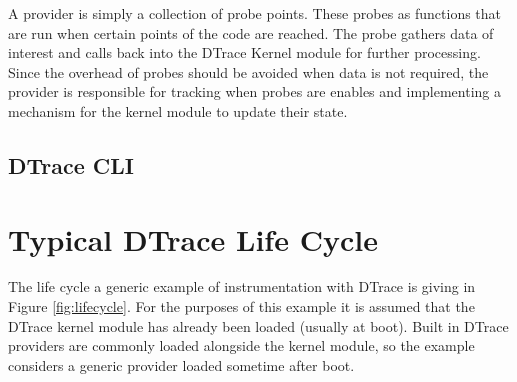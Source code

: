 A provider is simply a collection of probe points. These probes as functions that are run when certain points of the code are reached. The probe gathers data of interest and calls back into the DTrace Kernel module for further processing. Since the overhead of probes should be avoided when data is not required, the provider is responsible for tracking when probes are enables and implementing a mechanism for the kernel module to update their state.





\subsection{DTrace CLI}


\section{Typical DTrace Life Cycle}


The life cycle a generic example of instrumentation with DTrace is giving in Figure \ref{fig:lifecycle}. For the purposes of this example it is assumed that the DTrace kernel module has already been loaded (usually at boot). Built in DTrace providers are commonly loaded alongside the kernel module, so the example considers a generic provider loaded sometime after boot.




